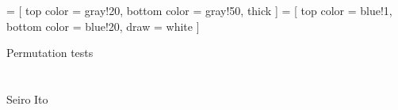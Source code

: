 

\renewcommand\Routcolor{\color{gray30}}
\newtheorem{finding}{Finding}[section]
\makeatletter
\g@addto@macro{\UrlBreaks}{\UrlOrds}
\newcommand\gobblepars{%
    \@ifnextchar\par%
        {\expandafter\gobblepars\@gobble}%
        {}}
\newenvironment{lightgrayleftbar}{%
  \def\FrameCommand{\textcolor{lightgray}{\vrule width 1zw} \hspace{10pt}}%
  \MakeFramed {\advance\hsize-\width \FrameRestore}}%
{\endMakeFramed}
\newenvironment{palepinkleftbar}{%
  \def\FrameCommand{\textcolor{palepink}{\vrule width 1zw} \hspace{10pt}}%
  \MakeFramed {\advance\hsize-\width \FrameRestore}}%
{\endMakeFramed}
\makeatother
\usepackage{caption}
\usepackage{setspace}
\usepackage{framed}
\def\pgfsysdriver{pgfsys-dvipdfm.def}
\usepackage{tikz}
\usetikzlibrary{calc, arrows, decorations, decorations.pathreplacing, backgrounds}
\usepackage{adjustbox}
 =
[
top color = gray!20, bottom color = gray!50, thick
]
 =
[
top color = blue!1, bottom color = blue!20, draw = white
]



\setlength{\baselineskip}{12pt}








\hfil Permutation tests\\

\hfil\MonthDY\\
\hfil{\footnotesize\currenttime}\\

\hfil Seiro Ito

\setcounter{tocdepth}{3}
\tableofcontents

\setlength{\parindent}{1em}
\vspace{2ex}


